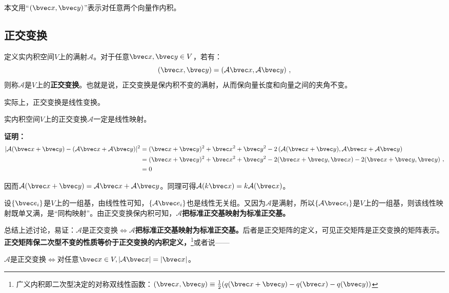 
本文用“$(\bvec x,\bvec y)$”表示对任意两个向量作内积。
\subsection{正交变换}
\begin{definition}{}
定义实内积空间$V$上的满射$\mathcal A$。对于任意$\bvec x,\bvec y\in V$，若有：
\begin{equation}
(\bvec x,\bvec y)=(\mathcal A \bvec x,\mathcal A \bvec y)~,
\end{equation}
则称$\mathcal A$是$V$上的\textbf{正交变换}。也就是说，正交变换是保内积不变的满射，从而保向量长度和向量之间的夹角不变。
\end{definition}
实际上，正交变换是线性变换。
\begin{theorem}{}\label{the_ortho_1}
实内积空间$V$上的正交变换$\mathcal A$一定是线性映射。
\end{theorem}
\textbf{证明：}
\begin{equation}
\begin{aligned}
|\mathcal A(\bvec x+\bvec y)-(\mathcal A\bvec x+\mathcal A\bvec y)|^2&=(\bvec x+\bvec y)^2+\bvec x^2+\bvec y^2-2\left(\mathcal A(\bvec x+\bvec y),\mathcal A\bvec x+\mathcal A\bvec y\right)\\
&=(\bvec x+\bvec y)^2+\bvec x^2+\bvec y^2-2(\bvec x+\bvec y,\bvec x)-2(\bvec x+\bvec y,\bvec y)\\
&=0
\end{aligned}
~,\end{equation}

因而$\mathcal A(\bvec x+\bvec y)=\mathcal A\bvec x+\mathcal A\bvec y$。同理可得$\mathcal A(k\bvec x)=k\mathcal A(\bvec x)$。

设$\{\bvec e_i\}$是$V$上的一组基，由线性性可知，$\{\mathcal A\bvec e_i\}$也是线性无关组。又因为$\mathcal A$是满射，所以$\{\mathcal A\bvec e_i\}$是$V$上的一组基，则该线性映射既单又满，是“同构映射”。由正交变换保内积可知，$\mathcal A$\textbf{把标准正交基映射为标准正交基。}

总结上述讨论，易证：$\mathcal A$是正交变换$\Longleftrightarrow \mathcal A$\textbf{把标准正交基映射为标准正交基。}后者是正交矩阵的定义，可见正交矩阵是正交变换的矩阵表示。\textbf{正交矩阵保二次型不变的性质等价于正交变换的内积定义，}\footnote{广义内积即二次型决定的对称双线性函数：$(\bvec x,\bvec y)\equiv \frac{1}{2}(q(\bvec x+\bvec y)-q(\bvec x)-q(\bvec y))$}或者说——

$\mathcal A$是正交变换$\Longleftrightarrow $对任意$\bvec x\in V,|\mathcal A\bvec x|=|\bvec x|$。

